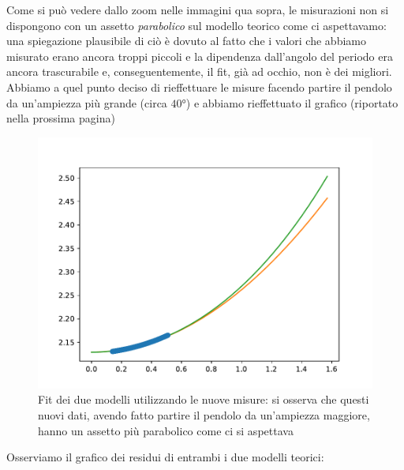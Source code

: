 \documentclass{article}
\begin{document}
\noindent Come si può vedere dallo zoom nelle immagini qua sopra, le misurazioni non si dispongono con un assetto \emph{parabolico} sul modello teorico come ci aspettavamo: una spiegazione plausibile di ciò è dovuto al fatto che i valori che abbiamo misurato erano ancora troppi piccoli e la dipendenza dall'angolo del periodo era ancora trascurabile e, conseguentemente, il fit, già ad occhio, non è dei migliori. Abbiamo a quel punto deciso di rieffettuare le misure facendo partire il pendolo da un'ampiezza più grande (circa $\ang{40}$) e abbiamo rieffettuato il grafico (riportato nella prossima pagina)

\begin{figure}[H]
	\centering
	\includegraphics[scale=0.60]{Fit_ampiezza.pdf}
	\caption{Fit dei due modelli utilizzando le nuove misure: si osserva che questi nuovi dati, avendo fatto partire il pendolo da un'ampiezza maggiore, hanno un assetto più parabolico come ci si aspettava}
\end{figure}
Osserviamo il grafico dei residui di entrambi i due modelli teorici:
\end{document}
